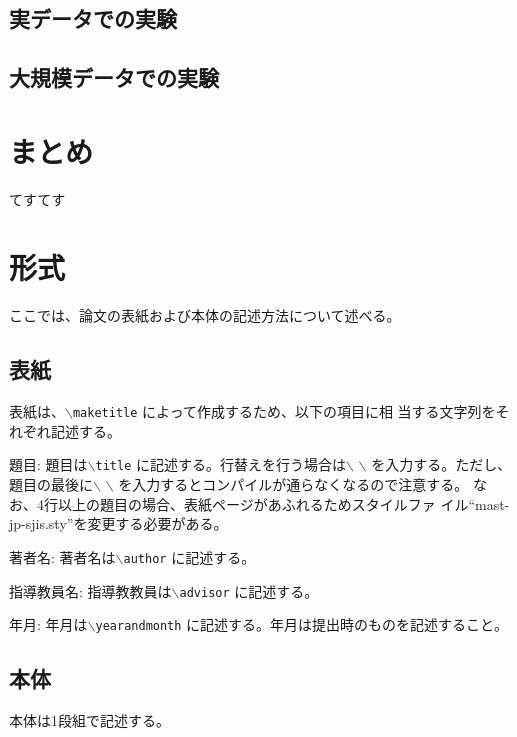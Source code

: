 \documentclass[a4paper,11pt]{jreport}
\begin{document}
\section{実データでの実験}
\section{大規模データでの実験}

\chapter{まとめ}

てすてす

\chapter{形式}

ここでは、論文の表紙および本体の記述方法について述べる。

\section{表紙}

表紙は、{\tt $\backslash$maketitle} によって作成するため、以下の項目に相
当する文字列をそれぞれ記述する。

\begin{description} \parskip=1pt
\item{題目: }
題目は{\tt $\backslash$title} に記述する。行替えを行う場合は$\backslash$
	   $\backslash$ を入力する。ただし、題目の最後に$\backslash$
	   $\backslash$ を入力するとコンパイルが通らなくなるので注意する。
	   なお、4行以上の題目の場合、表紙ページがあふれるためスタイルファ
	   イル``mast-jp-sjis.sty''を変更する必要がある。
\item{著者名: }
著者名は{\tt $\backslash$author} に記述する。
\item{指導教員名: }
指導教教員は{\tt $\backslash$advisor} に記述する。
\item{年月: }
年月は{\tt $\backslash$yearandmonth} に記述する。年月は提出時のものを記述すること。
\end{description}

\section{本体}

本体は1段組で記述する。
\end{document}
